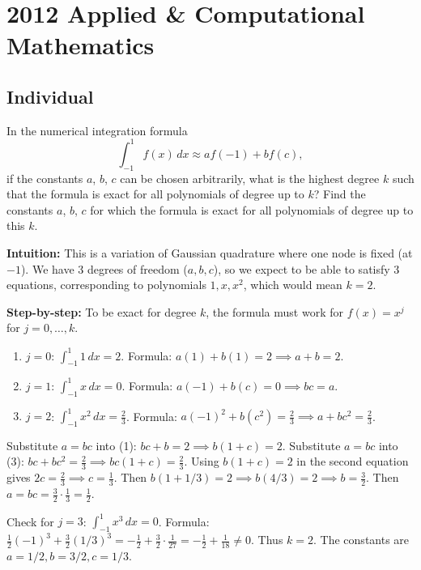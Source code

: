\section{2012 Applied \& Computational Mathematics}

\subsection{Individual}

\begin{exercise}
\label{applied:2012:1}
In the numerical integration formula
\[
\int_{-1}^{1}f(x)\,dx\approx af(-1)+bf(c),
\]
if the constants $a$, $b$, $c$ can be chosen arbitrarily, what is the highest degree $k$ such that the formula is exact for all polynomials of degree up to $k$? Find the constants $a$, $b$, $c$ for which the formula is exact for all polynomials of degree up to this $k$.
\end{exercise}

\begin{solution}
\textbf{Intuition:} This is a variation of Gaussian quadrature where one node is fixed (at $-1$). We have 3 degrees of freedom ($a, b, c$), so we expect to be able to satisfy 3 equations, corresponding to polynomials $1, x, x^2$, which would mean $k=2$.

\textbf{Step-by-step:}
To be exact for degree $k$, the formula must work for $f(x) = x^j$ for $j=0, \dots, k$.
\begin{enumerate}
    \item $j=0$: $\int_{-1}^1 1 \, dx = 2$. Formula: $a(1) + b(1) = 2 \implies a+b=2$.
    \item $j=1$: $\int_{-1}^1 x \, dx = 0$. Formula: $a(-1) + b(c) = 0 \implies bc = a$.
    \item $j=2$: $\int_{-1}^1 x^2 \, dx = \frac{2}{3}$. Formula: $a(-1)^2 + b(c^2) = \frac{2}{3} \implies a + bc^2 = \frac{2}{3}$.
\end{enumerate}
Substitute $a = bc$ into (1): $bc + b = 2 \implies b(1+c) = 2$.
Substitute $a = bc$ into (3): $bc + bc^2 = \frac{2}{3} \implies bc(1+c) = \frac{2}{3}$.
Using $b(1+c)=2$ in the second equation gives $2c = \frac{2}{3} \implies c = \frac{1}{3}$.
Then $b(1 + 1/3) = 2 \implies b(4/3) = 2 \implies b = \frac{3}{2}$.
Then $a = bc = \frac{3}{2} \cdot \frac{1}{3} = \frac{1}{2}$.

Check for $j=3$: $\int_{-1}^1 x^3 \, dx = 0$.
Formula: $\frac{1}{2}(-1)^3 + \frac{3}{2}(1/3)^3 = -\frac{1}{2} + \frac{3}{2} \cdot \frac{1}{27} = -\frac{1}{2} + \frac{1}{18} \neq 0$.
Thus $k=2$. The constants are $a = 1/2, b = 3/2, c = 1/3$.
\end{solution}

